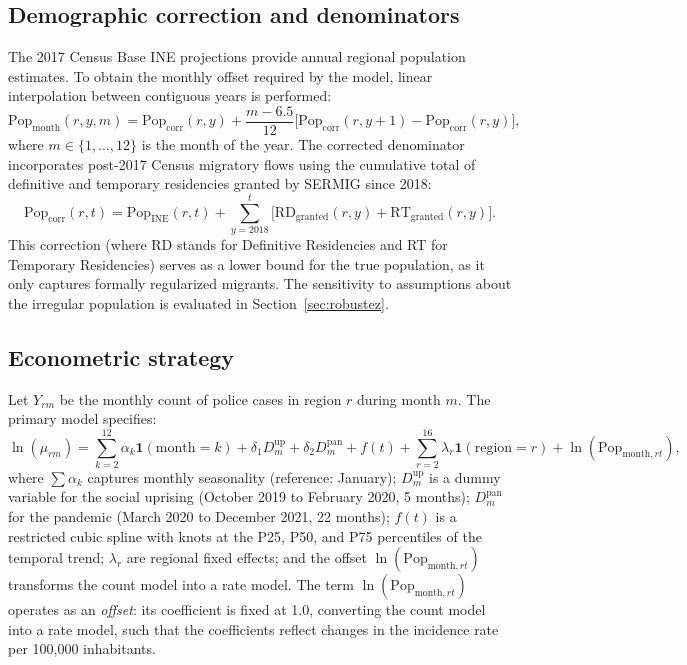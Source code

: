 \documentclass[pdflatex,sn-basic]{sn-jnl}
\begin{document}
\subsection{Demographic correction and denominators}
\label{sub:pop}

The 2017 Census Base INE projections provide annual regional population estimates.
To obtain the monthly offset required by the model, linear interpolation between
contiguous years is performed:
\[
  \text{Pop}_{\text{month}}(r,y,m)
  = \text{Pop}_{\text{corr}}(r,y)
  + \frac{m - 6.5}{12}
  \bigl[\text{Pop}_{\text{corr}}(r,y+1) - \text{Pop}_{\text{corr}}(r,y)\bigr],
\]
where $m \in \{1,\ldots,12\}$ is the month of the year. The corrected denominator incorporates
post-2017 Census migratory flows using the cumulative total of definitive and temporary
residencies granted by SERMIG since 2018:
\[
  \text{Pop}_{\text{corr}}(r,t)
  = \text{Pop}_{\text{INE}}(r,t)
  + \sum_{y=2018}^{t}\bigl[\text{RD}_{\text{granted}}(r,y) + \text{RT}_{\text{granted}}(r,y)\bigr].
\]
This correction (where RD stands for Definitive Residencies and RT for Temporary Residencies)
serves as a lower bound for the true population, as it only captures
formally regularized migrants. The sensitivity to assumptions about the irregular
population is evaluated in Section~\ref{sec:robustez}.

\subsection{Econometric strategy}

Let $Y_{rm}$ be the monthly count of police cases in region $r$ during month $m$.
The primary model specifies:
\begin{equation}
  \ln(\mu_{rm})
  = \sum_{k=2}^{12} \alpha_k \mathbf{1}(\text{month}=k)
  + \delta_1 D^{\text{up}}_m + \delta_2 D^{\text{pan}}_m
  + f(t) + \sum_{r=2}^{16} \lambda_r \mathbf{1}(\text{region}=r)
  + \ln(\text{Pop}_{\text{month},rt}),
  \label{eq:poisson}
\end{equation}
where $\sum \alpha_k$ captures monthly seasonality (reference: January);
$D^{\text{up}}_m$ is a dummy variable for the social uprising (October 2019 to February 2020, 5 months);
$D^{\text{pan}}_m$ for the pandemic (March 2020 to December 2021, 22 months);
$f(t)$ is a restricted cubic spline with knots at the P25, P50, and P75 percentiles of the temporal trend;
$\lambda_r$ are regional fixed effects; and the offset $\ln(\text{Pop}_{\text{month},rt})$ transforms the count model
into a rate model. The term $\ln(\text{Pop}_{\text{month},rt})$ operates as an \textit{offset}: its coefficient is fixed at 1.0, converting the count model into a rate model, such that the coefficients reflect changes in the incidence rate per 100,000 inhabitants.
\end{document}
